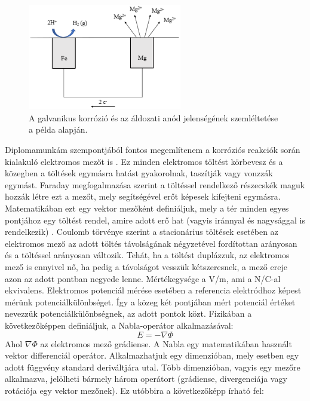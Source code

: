 \begin{figure}
\centering
\includegraphics[width=0.6\textwidth]{img/corrosion.eps}
\caption{A galvanikus korrózió és az áldozati anód jelenségének szemléltetése a példa alapján.}
\label{fig:corrosion}
\end{figure}

Diplomamunkám szempontjából fontos megemlítenem a korróziós reakciók során kialakuló elektromos mezőt is \cite{morley1994principles}. Ez minden elektromos töltést körbevesz és a közegben a töltések egymásra hatást gyakorolnak, taszítják vagy vonzzák egymást. Faraday megfogalmazása szerint a töltéssel rendelkező részecskék maguk hozzák létre ezt a mezőt, mely segítségével erőt képesek kifejteni egymásra. Matematikában ezt egy vektor mezőként definiáljuk, mely a tér minden egyes pontjához egy töltést rendel, amire adott erő hat (vagyis iránnyal és nagysággal is rendelkezik) \cite{purcell2013electricity}. Coulomb törvénye szerint a stacionárius töltések esetében az elektromos mező az adott töltés távolságának négyzetével fordítottan arányosan és a töltéssel arányosan változik. Tehát, ha a töltést duplázzuk, az elektromos mező is ennyivel nő, ha pedig a távolságot vesszük kétszeresnek, a mező ereje azon az adott pontban negyede lenne. Mértékegysége a V/m, ami a N/C-al ekvivalens. Elektromos potenciál mérése esetében a referencia elektródhoz képest mérünk potenciálkülönbséget. Így a közeg két pontjában mért potenciál értéket nevezzük potenciálkülönbségnek, az adott pontok közt. Fizikában a következőképpen definiáljuk, a Nabla-operátor alkalmazásával:
\begin{equation}
{E} = - \nabla \Phi
\label{eq:field}
\end{equation}
Ahol $\nabla \Phi$ az elektromos mező grádiense. A Nabla egy matematikában használt vektor differenciál operátor. Alkalmazhatjuk egy dimenzióban, mely esetben egy adott függvény standard deriváltjára utal. Több dimenzióban, vagyis egy mezőre alkalmazva, jelölheti bármely három operátort (grádiense, divergenciája vagy rotációja egy vektor mezőnek). Ez utóbbira a következőképp írható fel:

